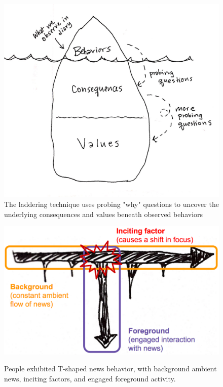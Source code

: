 \documentclass[sigchi]{acmart}
\begin{document}
\begin{figure}
    \centering
     \includegraphics[width=\columnwidth]{figures/laddering.png}
    \caption{The laddering technique uses probing "why" questions to uncover the underlying consequences and values beneath observed behaviors}
    \label{fig:laddering}
\end{figure}


\begin{figure}
  \caption{People exhibited T-shaped news behavior, with background ambient news, inciting factors, and engaged foreground activity.}
  \includegraphics[width=\columnwidth]{figures/t-shaped-behavior.png}
  \label{fig:tshapedbehavior}
\end{figure}
\end{document}
